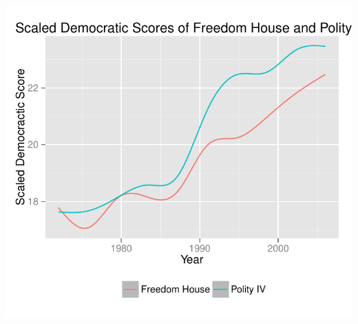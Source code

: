 \documentclass[a4paper]{article}\usepackage[]{graphicx}\usepackage[]{color}
\makeatletter
\def\maxwidth{ %
  \ifdim\Gin@nat@width>\linewidth
    \linewidth
  \else
    \Gin@nat@width
  \fi
}
\makeatother
\begin{document}
\includegraphics[width=\maxwidth]{figure/unnamed-chunk-1-1} 
\end{document}
